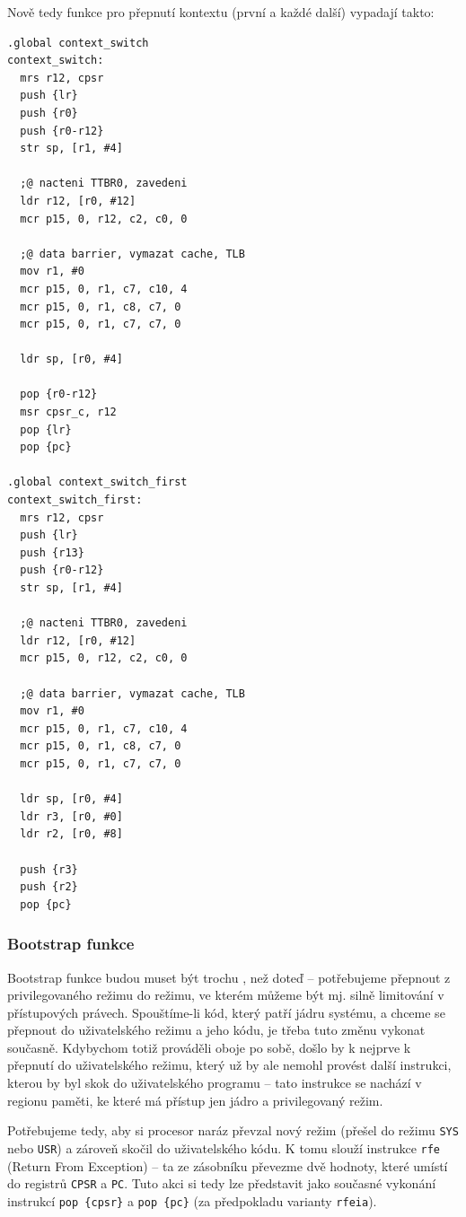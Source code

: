 \documentclass{article}
\begin{document}
Nově tedy funkce pro přepnutí kontextu (první a každé další) vypadají takto:
\begin{lstlisting}
.global context_switch
context_switch:
  mrs r12, cpsr
  push {lr}
  push {r0}
  push {r0-r12}
  str sp, [r1, #4]

  ;@ nacteni TTBR0, zavedeni
  ldr r12, [r0, #12]
  mcr p15, 0, r12, c2, c0, 0

  ;@ data barrier, vymazat cache, TLB
  mov r1, #0
  mcr p15, 0, r1, c7, c10, 4
  mcr p15, 0, r1, c8, c7, 0
  mcr p15, 0, r1, c7, c7, 0

  ldr sp, [r0, #4]

  pop {r0-r12}
  msr cpsr_c, r12
  pop {lr}
  pop {pc}

.global context_switch_first
context_switch_first:
  mrs r12, cpsr
  push {lr}
  push {r13}
  push {r0-r12}
  str sp, [r1, #4]

  ;@ nacteni TTBR0, zavedeni
  ldr r12, [r0, #12]
  mcr p15, 0, r12, c2, c0, 0
  
  ;@ data barrier, vymazat cache, TLB
  mov r1, #0
  mcr p15, 0, r1, c7, c10, 4
  mcr p15, 0, r1, c8, c7, 0
  mcr p15, 0, r1, c7, c7, 0

  ldr sp, [r0, #4]
  ldr r3, [r0, #0]
  ldr r2, [r0, #8]

  push {r3}
  push {r2}
  pop {pc}
\end{lstlisting}

\subsubsection{Bootstrap funkce}

Bootstrap funkce budou muset být trochu , než doteď -- potřebujeme přepnout z privilegovaného režimu do režimu, ve kterém můžeme být mj. silně limitování v přístupových právech. Spouštíme-li kód, který patří jádru systému, a chceme se přepnout do uživatelského režimu a jeho kódu, je třeba tuto změnu vykonat současně. Kdybychom totiž prováděli oboje po sobě, došlo by k nejprve k přepnutí do uživatelského režimu, který už by ale nemohl provést další instrukci, kterou by byl skok do uživatelského programu -- tato instrukce se nachází v regionu paměti, ke které má přístup jen jádro a privilegovaný režim.

Potřebujeme tedy, aby si procesor naráz převzal nový režim (přešel do režimu {\tt SYS} nebo {\tt USR}) a zároveň skočil do uživatelského kódu. K tomu slouží instrukce {\tt rfe} (Return From Exception) -- ta ze zásobníku převezme dvě hodnoty, které umístí do registrů {\tt CPSR} a {\tt PC}. Tuto akci si tedy lze představit jako současné vykonání instrukcí {\tt pop \{cpsr\}} a {\tt pop \{pc\}} (za předpokladu varianty {\tt rfeia}).
\end{document}
